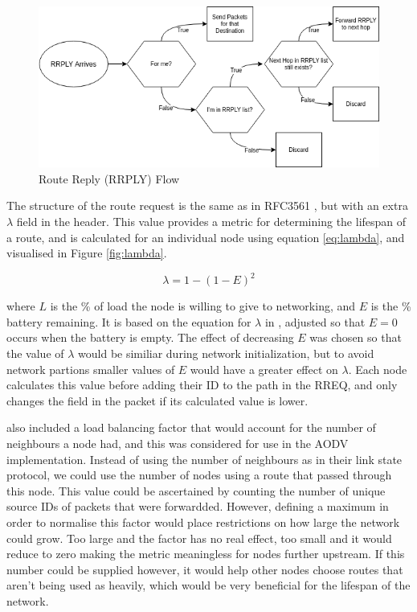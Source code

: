 \documentclass[12pt]{article}
\begin{document}
\begin{figure}[h]
	\centering
	\includegraphics[width=\linewidth]{images/rrplyflow}
	\caption{Route Reply (RRPLY) Flow}
	\label{fig:rrplyflow}
\end{figure}

The structure of the route request is the same as in RFC3561 \cite{aodv}, but with an extra $\lambda$ field in the header. This value provides a metric for determining the lifespan of a route, and is calculated for an individual node using equation \ref{eq:lambda}, and visualised in Figure \ref{fig:lambda}. 

\begin{equation} \label{eq:lambda}
	\lambda = 1 -(1 - E)^2
\end{equation}

where $L$ is the \% of load the node is willing to give to networking, and $E$ is the \% battery remaining. It is based on the equation for $\lambda$ in \cite{groups}, adjusted so that $E = 0$ occurs when the battery is empty. 
The effect of decreasing $E$ was chosen so that the value of $\lambda$ would be similiar during network initialization, but to avoid network partions smaller values of $E$ would have a greater effect on $\lambda$.
Each node calculates this value before adding their ID to the path in the RREQ, and only changes the field in the packet if its calculated value is lower. 

\cite{groups} also included a load balancing factor that would account for the number of neighbours a node had, and this was considered for use in the AODV implementation. Instead of using the number of neighbours as in their link state protocol, we could use the number of nodes using a route that passed through this node. 
This value could be ascertained by counting the number of unique source IDs of packets that were forwardded. However, defining a maximum in order to normalise this factor would place restrictions on how large the network could grow. Too large and the factor has no real effect, too small and it would reduce to zero making the metric meaningless for nodes further upstream. If this number could be supplied however, it would help other nodes choose routes that aren't being used as heavily, which would be very beneficial for the lifespan of the network.
\end{document}

